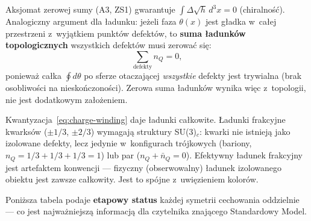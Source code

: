 \begin{remark}\label{rem:charge-zero-sum}
Aksjomat zerowej sumy (A3, ZS1) gwarantuje
$\int\Delta\sqrt{h}\,d^3x = 0$ (chiralno\'s\'c).
Analogiczny argument dla \l{}adunku:
je\.zeli faza $\theta(x)$ jest g\l{}adka w~ca\l{}ej
przestrzeni z~wyj\k{a}tkiem punkt\'ow defekt\'ow,
to \textbf{suma \l{}adunk\'ow topologicznych}
wszystkich defekt\'ow musi zerowa\'c si\k{e}:
\begin{equation}\label{eq:charge-ZS}
  \sum_{\mathrm{defekty}} n_Q = 0,
\end{equation}
poniewa\.z ca\l{}ka $\oint d\theta$ po sferze
otaczaj\k{a}cej \emph{wszystkie} defekty jest
trywialna (brak osobliwo\'sci na niesko\'nczono\'sci).
Zerowa suma \l{}adunk\'ow wynika wi\k{e}c
z~topologii, nie jest dodatkowym za\l{}o\.zeniem.
\end{remark}

\begin{remark}\label{rem:fractional-charges}
Kwantyzacja~\eqref{eq:charge-winding} daje \l{}adunki ca\l{}kowite.
\L{}adunki frakcyjne kwarks\'ow ($\pm 1/3$, $\pm 2/3$)
wymagaj\k{a} struktury SU(3)$_c$: kwarki nie istniej\k{a}
jako izolowane defekty, lecz jedynie w~konfigurach
tr\'ojkowych (bariony, $n_Q = 1/3 + 1/3 + 1/3 = 1$)
lub par ($n_Q + \bar{n}_Q = 0$). Efektywny \l{}adunek
frakcyjny jest artefaktem konwencji --- fizyczny (obserwowalny)
\l{}adunek izolowanego obiektu jest zawsze ca\l{}kowity.
Jest to sp\'ojne z~uwi\k{e}zieniem kolor\'ow.
\end{remark}

\begin{remark}\label{rem:gauge-status}
Poni\.zsza tabela podaje \textbf{etapowy status} ka\.zdej symetrii cechowania
oddzielnie --- co jest najwa\.zniejsz\k{a} informacj\k{a} dla czytelnika
znaj\k{a}cego Standardowy Model.
\end{remark}

